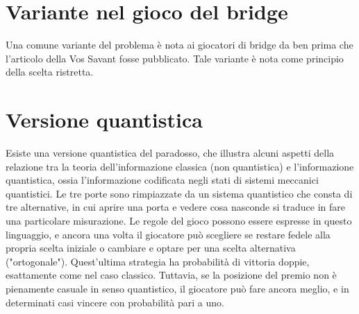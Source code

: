 \documentclass[a4paper, 12pt]{report}
\begin{document}
\section{Variante nel gioco del bridge}
Una comune variante del problema è nota ai giocatori di bridge da ben prima che l'articolo della Vos Savant fosse pubblicato. Tale variante è nota come principio della scelta ristretta.

\section{Versione quantistica}
Esiste una versione quantistica del paradosso, che illustra alcuni aspetti della relazione tra la teoria dell'informazione classica (non quantistica) e l'informazione quantistica, ossia l'informazione codificata negli stati di sistemi meccanici quantistici. Le tre porte sono rimpiazzate da un sistema quantistico che consta di tre alternative, in cui aprire una porta e vedere cosa nasconde si traduce in fare una particolare misurazione. Le regole del gioco possono essere espresse in questo linguaggio, e ancora una volta il giocatore può scegliere se restare fedele alla propria scelta iniziale o cambiare e optare per una scelta alternativa ("ortogonale"). Quest'ultima strategia ha probabilità di vittoria doppie, esattamente come nel caso classico. Tuttavia, se la posizione del premio non è pienamente casuale in senso quantistico, il giocatore può fare ancora meglio, e in determinati casi vincere con probabilità pari a uno.
\end{document}
